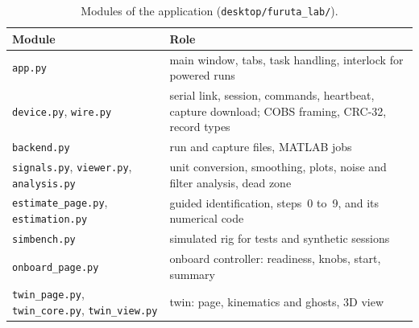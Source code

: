 \documentclass[a4paper,11pt]{article}
\begin{document}
\begin{table}[htbp]
\centering
\caption{Modules of the application (\nolinkurl{desktop/furuta_lab/}).}
\label{tab:app_modules}
\footnotesize
\setlength{\tabcolsep}{4pt}
\begin{tabular}{@{}p{5.4cm}p{9.4cm}@{}}
\toprule
Module & Role \\
\midrule
\texttt{app.py} & main window, tabs, task handling, interlock for powered runs \\
\texttt{device.py}, \texttt{wire.py} & serial link, session, commands, heartbeat, capture download; COBS framing, CRC-32, record types \\
\texttt{backend.py} & run and capture files, MATLAB jobs \\
\texttt{signals.py}, \texttt{viewer.py}, \texttt{analysis.py} & unit conversion, smoothing, plots, noise and filter analysis, dead zone \\
\texttt{estimate\_page.py}, \texttt{estimation.py} & guided identification, steps~0 to~9, and its numerical code \\
\texttt{simbench.py} & simulated rig for tests and synthetic sessions \\
\texttt{onboard\_page.py} & onboard controller: readiness, knobs, start, summary \\
\texttt{twin\_page.py}, \texttt{twin\_core.py}, \texttt{twin\_view.py} & twin: page, kinematics and ghosts, 3D view \\
\bottomrule
\end{tabular}
\end{table}
\end{document}
